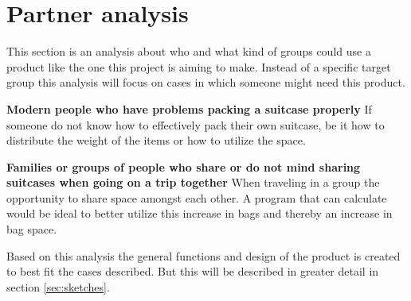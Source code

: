 \section{Partner analysis}
This section is an analysis about who and what kind of groups could use a product like the one this project is aiming to make.
Instead of a specific target group this analysis will focus on cases in which someone might need this product.

\textbf{Modern people who have problems packing a suitcase properly}
If someone do not know how to effectively pack their own suitcase, be it how to distribute the weight of the items or how to utilize the space.

\textbf{Families or groups of people who share or do not mind sharing suitcases when going on a trip together}
When traveling in a group the opportunity to share space amongst each other. A program that can calculate would be ideal to better utilize this increase in bags and thereby an increase in bag space. 

Based on this analysis the general functions and design of the product is created to best fit the cases described. But this will be described in greater detail in section \ref{sec:sketches}.